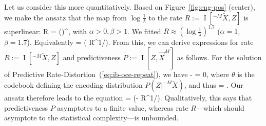\documentclass[entropy,article,submit,moreauthors,pdftex,10pt,a4paper]{Definitions/mdpi}
\newif \ifcomment
\newcommand\rljf[1]{\ifcomment{{\color{blue}(#1)}}\else{}\fi}
\newcommand{\finitefuture}{\overrightarrow{X}^{M}}
\newcommand{\finitepast}{^{-M}\overleftarrow{X}}%
\let\oldequation\equation
\let\oldendequation\endequation
\renewenvironment{equation}
  {\linenomathNonumbers\oldequation}
  {\oldendequation\endlinenomath}
\begin{document}
Let us consider this more quantitatively.
Based on Figure~\ref{fig:eng-pos} (center), we make the ansatz that the map from $\log\frac{1}{\lambda}$ to the rate $R := \operatorname{I}[\finitepast, Z]$ is superlinear:
\begin{equation}\label{eq:r-alpha-beta}
	R = \alpha \left(\log{}\right)^\beta,
\end{equation}
	with $\alpha>0, \beta>1$.
We fitted $R \approx \left(\log\frac{1}{\lambda}\right)^{1.7}$ ($\alpha=1$, $\beta=1.7$).
Equivalently
\begin{equation}
 = \exp\left( R^{1/\beta}\right).
\end{equation}
From this, we can derive expressions for rate $R := \operatorname{I}[\finitepast, Z]$ and predictiveness $P := \operatorname{I}[Z, \finitefuture]$ as follows.
For the solution of Predictive Rate-Distortion~(\ref{eq:ib-oce-repeat}), we have
\begin{equation}
	 - \lambda {} = 0,
\end{equation}
where $\theta$ is the codebook defining the encoding distribution $P(Z|\finitepast)$, and thus
\begin{equation}
\lambda =	.
\end{equation}
Our ansatz therefore leads to the equation
\begin{equation}\label{eq:derivatives}
 = \exp\left(- R^{1/\beta}\right). %
\end{equation}
Qualitatively, this says that predictiveness $P$ asymptotes to a finite value, whereas rate $R$---which should asymptote to the statistical complexity---is unbounded. 
\end{document}
